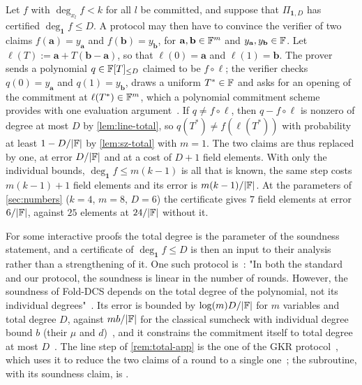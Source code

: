 \begin{remark}\label{rem:total-app}
Let $f$ with $\deg_{x_l}f<k$ for all $l$ be committed, and suppose that $\Pi_{\mathbf 1,D}$ has
certified $\deg_{\mathbf 1}f\le D$. A protocol may then have to convince the verifier of two claims
$f(\mathbf a)=y_{\mathbf a}$ and $f(\mathbf b)=y_{\mathbf b}$, for $\mathbf a,\mathbf b\in\mathbb{F}^m$ and
$y_{\mathbf a},y_{\mathbf b}\in\mathbb{F}$. Let $\ell(T):=\mathbf a+T(\mathbf b-\mathbf a)$, so that
$\ell(0)=\mathbf a$ and $\ell(1)=\mathbf b$. The prover sends a polynomial $q\in\mathbb{F}[T]_{\le D}$
claimed to be $f\circ\ell$; the verifier checks $q(0)=y_{\mathbf a}$ and $q(1)=y_{\mathbf b}$, draws
a uniform $T^*\in\mathbb{F}$ and asks for an opening of the commitment at $\ell(T^*)\in\mathbb{F}^m$, which a
polynomial commitment scheme provides with one evaluation argument~\cite{PolyFRIM}. If
$q\ne f\circ\ell$, then $q-f\circ\ell$ is nonzero of degree at most $D$ by \cref{lem:line-total}, so
$q(T^*)\ne f(\ell(T^*))$ with probability at least $1-D/|\mathbb{F}|$ by \cref{lem:sz-total} with $m=1$. The
two claims are thus replaced by one, at error $D/|\mathbb{F}|$ and at a cost of $D+1$ field elements. With
only the individual bounds, $\deg_{\mathbf 1}f\le m(k-1)$ is all that is known, the same step costs
$m(k-1)+1$ field elements and its error is $m(k-1)/|\mathbb{F}|$. At the parameters of \cref{sec:numbers} ($k=4$,
$m=8$, $D=6$) the certificate gives $7$ field elements at error $6/|\mathbb{F}|$, against $25$ elements at
$24/|\mathbb{F}|$ without it.
\end{remark}

\begin{remark}\label{rem:total-prior}
For some interactive proofs the total degree is the parameter of the soundness statement, and a
certificate of $\deg_{\mathbf 1}f\le D$ is then an input to their analysis rather than a
strengthening of it. One such protocol is~\cite{FoldDCS}: "In both the standard and our protocol, the
soundness is linear in the number of rounds. However, the soundness of Fold-DCS depends on the total
degree of the polynomial, not its individual degrees"~\cite[p.~2]{FoldDCS}. Its error is bounded by
$\log(m)D/|\mathbb{F}|$ for $m$ variables and total degree $D$, against $mb/|\mathbb{F}|$ for the classical
sumcheck with individual degree bound $b$ (their $\mu$ and $d$)~\cite[\S3.2.2]{FoldDCS}, and it constrains the commitment
itself to total degree at most $D$~\cite[\S4.2.1]{FoldDCS}. The line step of \cref{rem:total-app} is
the one of the GKR protocol~\cite{GKR15}, which uses it to reduce the two claims of a round to a
single one~\cite[\S4.6.4]{Thaler22}; the subroutine, with its soundness claim, is
\cite[\S4.5.2, Claim~4.6]{Thaler22}.
\end{remark}
